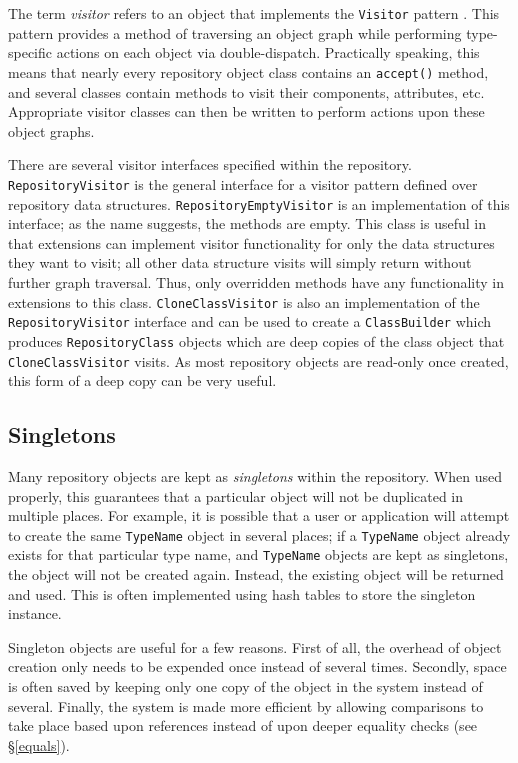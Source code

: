\documentclass{report}
\begin{document}

The term {\em visitor} refers to an object that implements the 
\texttt{Visitor} pattern \cite{Gamma1995}. This pattern provides a method of 
traversing an object graph while performing type-specific actions on each 
object via double-dispatch. Practically speaking, this means that nearly every
repository object class contains an \texttt{accept()} method, and several
classes contain methods to visit their components, attributes, etc.
Appropriate visitor classes can then be written to perform actions upon these
object graphs.

There are several visitor interfaces specified within the repository.
\texttt{Re\-pos\-i\-tory\-Vis\-i\-tor} is the general interface for a visitor 
pattern 
defined over repository data structures. \texttt{RepositoryEmptyVisitor}
is an implementation of this interface; as the name suggests, the methods are
empty. This class is useful in that extensions can implement visitor
functionality for only the data structures they want to visit; all other
data structure visits will simply return without further graph traversal.
Thus, only overridden methods have any functionality in extensions to this 
class. \texttt{CloneClassVisitor} is also an implementation of the
\texttt{Re\-pos\-i\-tory\-Vis\-i\-tor} interface and can be used to create a
\texttt{ClassBuilder} which produces \texttt{Re\-pos\-i\-tory\-Class} objects 
which are deep copies of the class object that \texttt{CloneClassVisitor} 
visits. As most repository objects are read-only once created, this form of a 
deep copy can be very useful.

\subsection{Singletons}

Many repository objects are kept as {\em singletons} within the 
repository. When used properly, this guarantees that a particular object 
will not be duplicated in multiple places. For example, it is possible that a
user or application will attempt to create the same \texttt{TypeName}
object in several places; if a \texttt{TypeName} object already exists
for that particular type name, and \texttt{TypeName} objects are
kept as singletons, the object will not be created again.
Instead, the existing object will be returned and used. This is often
implemented using hash tables to store the singleton instance.

Singleton objects are useful for a few reasons. First of all, the overhead
of object creation only needs to be expended once instead of several times.
Secondly, space is often saved by keeping only one copy of the object in
the system instead of several. Finally, the system is made more efficient by
allowing comparisons to take place based upon references instead of upon
deeper equality checks (see \S \ref{equals}).
\end{document}
